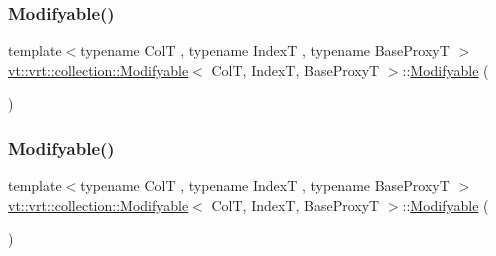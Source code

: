 \subsubsection{\texorpdfstring{Modifyable()}{Modifyable()}\hspace{0.1cm}{\footnotesize\ttfamily [1/4]}}
{\footnotesize\ttfamily template$<$typename ColT , typename IndexT , typename Base\+ProxyT $>$ \\
\hyperlink{structvt_1_1vrt_1_1collection_1_1_modifyable}{vt\+::vrt\+::collection\+::\+Modifyable}$<$ ColT, IndexT, Base\+ProxyT $>$\+::\hyperlink{structvt_1_1vrt_1_1collection_1_1_modifyable}{Modifyable} (\begin{DoxyParamCaption}{ }\end{DoxyParamCaption})\hspace{0.3cm}{\ttfamily [default]}}

\mbox{\label{structvt_1_1vrt_1_1collection_1_1_modifyable_a0b3ac953a30f284b7415970df401e415}} 
\subsubsection{\texorpdfstring{Modifyable()}{Modifyable()}\hspace{0.1cm}{\footnotesize\ttfamily [2/4]}}
{\footnotesize\ttfamily template$<$typename ColT , typename IndexT , typename Base\+ProxyT $>$ \\
\hyperlink{structvt_1_1vrt_1_1collection_1_1_modifyable}{vt\+::vrt\+::collection\+::\+Modifyable}$<$ ColT, IndexT, Base\+ProxyT $>$\+::\hyperlink{structvt_1_1vrt_1_1collection_1_1_modifyable}{Modifyable} (\begin{DoxyParamCaption}\item[{\hyperlink{structvt_1_1vrt_1_1collection_1_1_modifyable}{Modifyable}$<$ ColT, IndexT, Base\+ProxyT $>$ const \&}]{ }\end{DoxyParamCaption})\hspace{0.3cm}{\ttfamily [default]}}

\mbox{\label{structvt_1_1vrt_1_1collection_1_1_modifyable_af1ebf873f6dd1c7991aeaacaff77149c}} 
